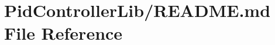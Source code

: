 \hypertarget{PidControllerLib_2README_8md}{}\section{Pid\+Controller\+Lib/\+R\+E\+A\+D\+ME.md File Reference}
\label{PidControllerLib_2README_8md}
